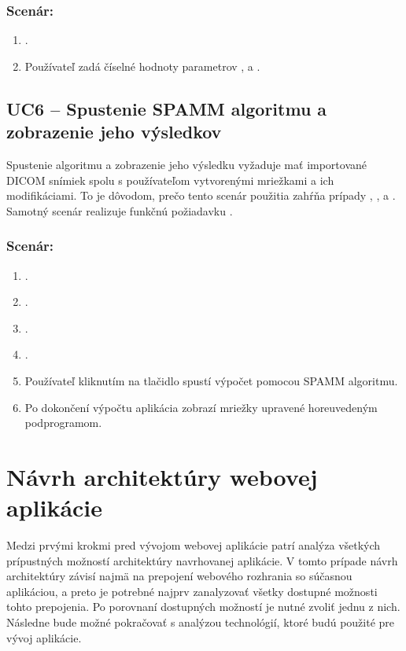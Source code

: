 \subsubsection*{Scenár:}
\begin {enumerate}
\item {.}
\item {Používateľ zadá číselné hodnoty parametrov , \newline {} a .}
\end {enumerate}

\subsection {UC6 -- Spustenie SPAMM algoritmu a zobrazenie jeho výsledkov}
Spustenie algoritmu a zobrazenie jeho výsledku vyžaduje mať importované DICOM snímiek spolu s používateľom vytvorenými mriežkami a ich modifikáciami. To je dôvodom, prečo tento scenár použitia zahŕňa prípady , ,  a . Samotný scenár realizuje funkčnú požiadavku .

\subsubsection*{Scenár:}
\begin {enumerate}
\item {}.
\item {}.
\item {}.
\item {}.
\item {Používateľ kliknutím na tlačidlo  spustí výpočet pomocou SPAMM algoritmu.}
\item {Po dokončení výpočtu aplikácia zobrazí mriežky upravené horeuvedeným podprogramom.}
\end {enumerate}

\clearpage

\section {Návrh architektúry webovej aplikácie}
Medzi prvými krokmi pred vývojom webovej aplikácie patrí analýza všetkých prípustných možností architektúry navrhovanej aplikácie. V tomto prípade návrh architektúry závisí najmä na prepojení webového rozhrania so súčasnou aplikáciou, a preto je potrebné najprv zanalyzovať všetky dostupné možnosti tohto prepojenia. Po porovnaní dostupných možností je nutné zvoliť jednu z nich. Následne bude možné pokračovať s analýzou technológií, ktoré budú použité pre vývoj aplikácie.

